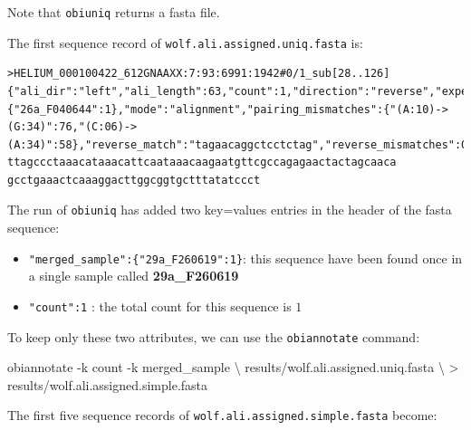\documentclass[
  letterpaper,
  DIV=11,
  numbers=noendperiod]{scrreprt}
\newenvironment{Shaded}{\begin{snugshade}}{\end{snugshade}}
\newcommand{\AttributeTok}[1]{\textcolor[rgb]{0.40,0.45,0.13}{#1}}
\newcommand{\DataTypeTok}[1]{\textcolor[rgb]{0.68,0.00,0.00}{#1}}
\newcommand{\ExtensionTok}[1]{\textcolor[rgb]{0.00,0.23,0.31}{#1}}
\newcommand{\NormalTok}[1]{\textcolor[rgb]{0.00,0.23,0.31}{#1}}
\newcommand{\OperatorTok}[1]{\textcolor[rgb]{0.37,0.37,0.37}{#1}}
\providecommand{\tightlist}{%
  \setlength{\itemsep}{0pt}\setlength{\parskip}{0pt}}\usepackage{longtable,booktabs,array}
\begin{document}
Note that \texttt{obiuniq} returns a fasta file.

The first sequence record of \texttt{wolf.ali.assigned.uniq.fasta} is:

\begin{verbatim}
>HELIUM_000100422_612GNAAXX:7:93:6991:1942#0/1_sub[28..126] {"ali_dir":"left","ali_length":63,"count":1,"direction":"reverse","experiment":"wolf_diet","forward_match":"ttagataccccactatgc","forward_mismatches":0,"forward_primer":"ttagataccccactatgc","forward_tag":"gaatatc","merged_sample":{"26a_F040644":1},"mode":"alignment","pairing_mismatches":{"(A:10)->(G:34)":76,"(C:06)->(A:34)":58},"reverse_match":"tagaacaggctcctctag","reverse_mismatches":0,"reverse_primer":"tagaacaggctcctctag","reverse_tag":"gaatatc","score":730,"score_norm":0.968,"seq_a_single":45,"seq_ab_match":61,"seq_b_single":45}
ttagccctaaacataaacattcaataaacaagaatgttcgccagagaactactagcaaca
gcctgaaactcaaaggacttggcggtgctttatatccct
\end{verbatim}

The run of \texttt{obiuniq} has added two key=values entries in the
header of the fasta sequence:

\begin{itemize}
\tightlist
\item
  \texttt{"merged\_sample":\{"29a\_F260619":1\}}: this sequence have
  been found once in a single sample called \textbf{29a\_F260619}
\item
  \texttt{"count":1} : the total count for this sequence is \(1\)
\end{itemize}

To keep only these two attributes, we can use the \texttt{obiannotate}
command:

\begin{Shaded}
\begin{Highlighting}[]
\ExtensionTok{obiannotate} \AttributeTok{{-}k}\NormalTok{ count }\AttributeTok{{-}k}\NormalTok{ merged\_sample }\DataTypeTok{\textbackslash{}}
\NormalTok{  results/wolf.ali.assigned.uniq.fasta }\DataTypeTok{\textbackslash{}}
  \OperatorTok{\textgreater{}}\NormalTok{ results/wolf.ali.assigned.simple.fasta}
\end{Highlighting}
\end{Shaded}

The first five sequence records of
\texttt{wolf.ali.assigned.simple.fasta} become:
\end{document}
